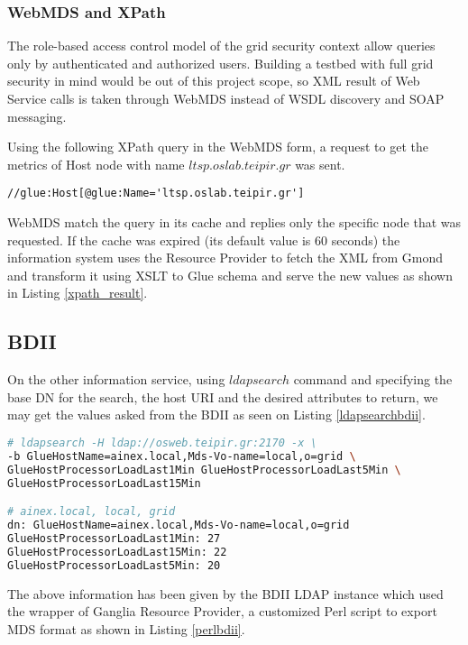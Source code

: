 \subsubsection{WebMDS and XPath}

The role-based access control model of the grid security context allow queries only by authenticated and authorized users. Building a testbed with full grid security in mind would be out of this project scope, so XML result of Web Service calls is taken through WebMDS instead of \ac{WSDL} discovery and \ac{SOAP} messaging.

Using the following XPath query in the WebMDS form, a request to get the metrics of Host node with name $ltsp.oslab.teipir.gr$ was sent.

\begin{verbatim}
//glue:Host[@glue:Name='ltsp.oslab.teipir.gr']
\end{verbatim}

WebMDS match the query in its cache and replies only the specific node that was requested. If the cache was expired (its default value is 60 seconds) the information system uses the Resource Provider to fetch the XML from Gmond and transform it using XSLT to Glue schema and serve the new values as shown in Listing \ref{xpath_result}.

\subsection{BDII}

On the other information service, using $ldapsearch$ command and specifying the base DN for the search, the host URI and the desired attributes to return, we may get the values asked from the BDII as seen on Listing \ref{ldapsearchbdii}.

\begin{lstlisting}[language=bash,caption=BDII LDAP search for Glue CE ProcessorLoad attributes,label=ldapsearchbdii]
# ldapsearch -H ldap://osweb.teipir.gr:2170 -x \
-b GlueHostName=ainex.local,Mds-Vo-name=local,o=grid \
GlueHostProcessorLoadLast1Min GlueHostProcessorLoadLast5Min \
GlueHostProcessorLoadLast15Min

# ainex.local, local, grid
dn: GlueHostName=ainex.local,Mds-Vo-name=local,o=grid
GlueHostProcessorLoadLast1Min: 27
GlueHostProcessorLoadLast15Min: 22
GlueHostProcessorLoadLast5Min: 20
\end{lstlisting}

The above information has been given by the BDII LDAP instance which used the wrapper of Ganglia Resource Provider, a customized Perl script to export MDS format as shown in Listing \ref{perlbdii}.

